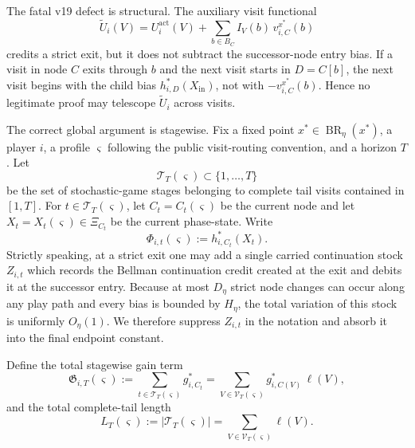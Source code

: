 \documentclass[12pt]{article}
\theoremstyle{definition}
\newcommand{\1}{\mathbf{1}}
\DeclareMathOperator{\BR}{BR}
\begin{document}
The fatal v19 defect is structural. The auxiliary visit functional
\[
\widetilde U_i(V)
=
U_i^{\mathrm{act}}(V)
+
\sum_{b\in B_C}I_V(b)\,v_{i,C}^{x^*}(b)
\]
credits a strict exit, but it does not subtract the successor-node entry bias. If
a visit in node $C$ exits through $b$ and the next visit starts in $D=C[b]$, the
next visit begins with the child bias $h_{i,D}^*(X_{\mathrm{in}})$, not with
$-v_{i,C}^{x^*}(b)$. Hence no legitimate proof may telescope
$\widetilde U_i$ across visits.

The correct global argument is stagewise. Fix a fixed point
$x^*\in\BR_\eta(x^*)$, a player $i$, a profile $\varsigma$ following the public
visit-routing convention, and a horizon $T$. Let
\[
\mathcal T_T(\varsigma)\subset\{1,\dots,T\}
\]
be the set of stochastic-game stages belonging to complete tail visits contained
in $[1,T]$. For $t\in\mathcal T_T(\varsigma)$, let $C_t=C_t(\varsigma)$ be the
current node and let $X_t=X_t(\varsigma)\in\Xi_{C_t}$ be the current phase-state.
Write
\[
\Phi_{i,t}(\varsigma):=h_{i,C_t}^*(X_t).
\]
Strictly speaking, at a strict exit one may add a single carried continuation
stock $Z_{i,t}$ which records the Bellman continuation credit created at the exit
and debits it at the successor entry. Because at most $D_\eta$ strict node changes
can occur along any play path and every bias is bounded by $H_\eta$, the total
variation of this stock is uniformly $O_\eta(1)$. We therefore suppress $Z_{i,t}$
in the notation and absorb it into the final endpoint constant.

Define the total stagewise gain term
\begin{equation}
\label{eq:gain-chain-def}
\mathfrak G_{i,T}(\varsigma)
:=
\sum_{t\in\mathcal T_T(\varsigma)} g_{i,C_t}^*
=
\sum_{V\in\mathcal V_T(\varsigma)} g_{i,C(V)}^*\,\ell(V),
\end{equation}
and the total complete-tail length
\[
L_T(\varsigma):=|\mathcal T_T(\varsigma)|
=
\sum_{V\in\mathcal V_T(\varsigma)}\ell(V).
\]
\end{document}
